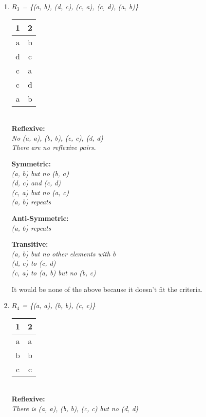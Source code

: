 \documentclass[11pt]{article}
\begin{document}
\begin{enumerate}
\begin{enumerate}[label=(\alph*)]
\item %
\textit {
$R_{3}$ = \{(a, b), (d, c), (c, a), (c, d), (a, b)\} \\
}
\begin {tabular} {c|c}
    \textbf {1} & \textbf {2} \\
    \hline
    a & b \\
    d & c \\
    c & a \\
    c & d \\
    a & b \\
\end {tabular} \\
\newline
\textbf {
Reflexive: 
} \\
\textit {
No (a, a), (b, b), (c, c), (d, d) \\
There are no reflexive pairs. \\
}

\textbf {
Symmetric: 
} \\
\textit {
(a, b) but no (b, a) \\
(d, c) and (c, d) \\
(c, a) but no (a, c) \\
(a, b) repeats \\
}

\textbf {
Anti-Symmetric: 
} \\
\textit {
(a, b) repeats \\
}

\textbf {
Transitive: 
} \\
\textit {
(a, b) but no other elements with b \\
(d, c) to (c, d) \\
(c, a) to (a, b) but no (b, c) \\
}

It would be none of the above because it doesn't fit the criteria. \\

\item %
\textit {
$R_{4}$ = \{(a, a), (b, b), (c, c)\} \\
}
\begin {tabular} {c|c}
    \textbf {1} & \textbf {2} \\
    \hline 
    a & a \\
    b & b \\
    c & c\\
\end {tabular} \\
\newline
\textbf {
Reflexive: 
} \\
\textit {
There is (a, a), (b, b), (c, c) but no (d, d) \\
}


\end{enumerate}
\end{enumerate}
\end{document}
